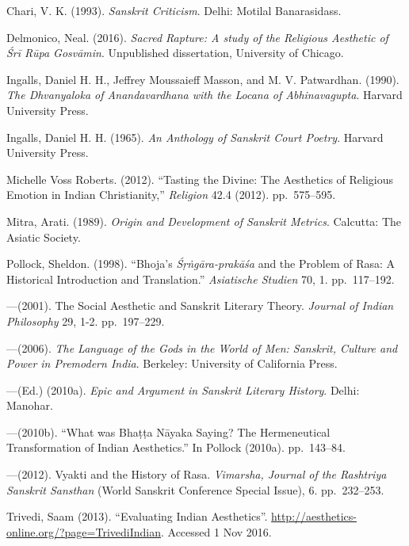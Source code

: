 \begin{thebibliography}{99}
\itemsep=2pt
Chari, V. K. (1993). \textsl{Sanskrit Criticism}. Delhi: Motilal Banarasidass.

Delmonico, Neal. (2016). \textsl{Sacred Rapture: A study of the Religious Aesthetic of Śrī Rūpa Gosvāmin}. Unpublished dissertation, University of Chicago.

Ingalls, Daniel H. H., Jeffrey Moussaieff Masson, and M. V. Patwardhan. (1990). \textsl{The Dhvanyaloka of Anandavardhana with the Locana of Abhinavagupta}. Harvard University Press.

Ingalls, Daniel H. H. (1965). \textsl{An Anthology of Sanskrit Court Poetry}. Harvard University Press.

Michelle Voss Roberts. (2012). ``Tasting the Divine: The Aesthetics of Religious Emotion in Indian Christianity,'' \textsl{Religion} 42.4 (2012). pp.~575--595.

Mitra, Arati. (1989). \textsl{Origin and Development of Sanskrit Metrics}. Calcutta: The Asiatic Society.

Pollock, Sheldon. (1998). ``Bhoja's \textsl{Śṛṅgāra-prakāśa} and the Problem of Rasa: A Historical Introduction and Translation.'' \textsl{Asiatische Studien} 70, 1. pp.~117--192. 

---\kern3pt(2001). The Social Aesthetic and Sanskrit Literary Theory. \textsl{Journal of Indian Philosophy} 29, 1-2. pp.~197--229.

---\kern3pt(2006). \textsl{The Language of the Gods in the World of Men: Sanskrit, Culture and Power in Premodern India}. Berkeley: University of California Press.

---\kern3pt(Ed.) (2010a). \textsl{Epic and Argument in Sanskrit Literary History}. Delhi: Manohar.

---\kern3pt(2010b). ``What was Bhaṭṭa Nāyaka Saying? The Hermeneutical Transformation of Indian Aesthetics.'' In Pollock (2010a). pp.~143--84.

---\kern3pt(2012). Vyakti and the History of Rasa. \textsl{Vimarsha, Journal of the Rashtriya Sanskrit Sansthan} (World Sanskrit Conference Special Issue), 6. pp.~232--253.

Trivedi, Saam (2013). ``Evaluating Indian Aesthetics''. \url{http://aesthetics-online.org/?page=TrivediIndian}. Accessed 1 Nov 2016.
\end{thebibliography}

\label{chapter\thechapter:end}
